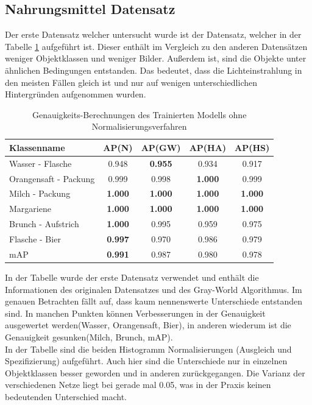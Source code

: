 \documentclass[a4paper,12pt,oneside]{article}
\begin{document}
  \subsection{Nahrungsmittel Datensatz}
Der erste Datensatz welcher untersucht wurde ist der Datensatz, welcher in der Tabelle \ref{tab:nahrungsmitteltest} aufgeführt ist. Dieser enthält im Vergleich zu den anderen Datensätzen weniger Objektklassen und weniger Bilder. Außerdem ist, sind die Objekte unter ähnlichen Bedingungen entstanden. Das bedeutet, dass die Lichteinstrahlung in den meisten Fällen gleich ist und nur auf wenigen unterschiedlichen Hintergründen aufgenommen wurden.
\begin{table}
[h]
\caption{Genauigkeits-Berechnungen des Trainierten Modells ohne Normalisierungsverfahren}
\centering
\begin{tabular}{|l|c|c|c|c|}
\hline
Klassenname & AP(N) & AP(GW) & AP(HA) & AP(HS)\\
\hline
Wasser - Flasche & 0.948 & \textbf{0.955} & 0.934 & 0.917\\
Orangensaft - Packung & 0.999 & 0.998 & \textbf{1.000} & 0.999\\
Milch - Packung & \textbf{1.000} & \textbf{1.000} & \textbf{1.000} & \textbf{1.000}\\
Margariene & \textbf{1.000} & \textbf{1.000} & \textbf{1.000} & \textbf{1.000}\\
Brunch - Aufstrich & \textbf{1.000} & 0.995 & 0.959 & 0.975\\
Flasche - Bier & \textbf{0.997} & 0.970 & 0.986 & 0.979\\
\hline
mAP & \textbf{0.991} & 0.987 & 0.980 & 0.978\\
\hline
\end{tabular}
\label{tab:nahrungsmitteltest}
\end{table}
In der Tabelle wurde der erste Datensatz verwendet und enthält die Informationen des originalen Datensatzes und des Gray-World Algorithmus. Im genauen Betrachten fällt auf, dass kaum nennenswerte Unterschiede entstanden sind. In manchen Punkten können Verbesserungen in der Genauigkeit ausgewertet werden(Wasser, Orangensaft, Bier), in anderen wiederum ist die Genauigkeit gesunken(Milch, Brunch, mAP).\\
In der Tabelle sind die beiden Histogramm Normalisierungen (Ausgleich und Spezifizierung) aufgeführt. Auch hier sind die Unterschiede nur in einzelnen Objektklassen besser geworden und in anderen zurückgegangen. Die Varianz der verschiedenen Netze liegt bei gerade mal 0.05, was in der Praxis keinen bedeutenden Unterschied macht.
\end{document}
